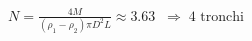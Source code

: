\documentclass[preview]{standalone}
\begin{document}
\begin{align*}
N = \tfrac{4M}{(\rho_1 - \rho_2)\pi D^{2}L} \approx 3.63 \;\;\Rightarrow\; 4 \text{ tronchi}
\end{align*}
\end{document}
